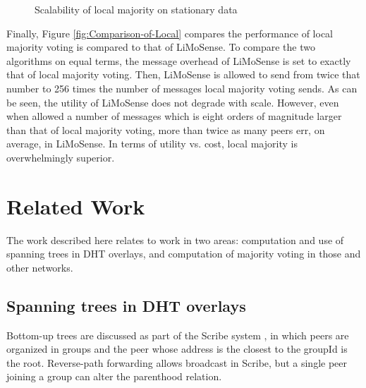\documentclass[12pt,english,journal]{elsarticle}
\numberwithin{equation}{section}
\numberwithin{figure}{section}
\theoremstyle{plain}
\theoremstyle{plain}
\begin{document}
\begin{figure}[p]
\caption{\label{fig:Scalability}Scalability of local majority on stationary
data}


\begin{minipage}[t]{0.5\textwidth}\end{minipage}\begin{minipage}[t]{0.5\textwidth}\end{minipage}

\centering{}\begin{minipage}[t]{0.5\textwidth}\end{minipage}
\end{figure}


Finally, Figure \ref{fig:Comparison-of-Local} compares the performance
of local majority voting is compared to that of LiMoSense. To compare
the two algorithms on equal terms, the message overhead of LiMoSense
is set to exactly that of local majority voting. Then, LiMoSense is
allowed to send from twice that number to 256 times the number of
messages local majority voting sends. As can be seen, the utility
of LiMoSense does not degrade with scale. However, even when allowed
a number of messages which is eight orders of magnitude larger than
that of local majority voting, more than twice as many peers err,
on average, in LiMoSense. In terms of utility vs. cost, local majority
is overwhelmingly superior.


\section{\label{sec:Related-Work}Related Work}

The work described here relates to work in two areas: computation
and use of spanning trees in DHT overlays, and computation of majority
voting in those and other networks.


\subsection{Spanning trees in DHT overlays}

Bottom-up trees are discussed as part of the Scribe system \citep{Scribe},
in which peers are organized in groups and the peer whose address
is the closest to the groupId is the root. Reverse-path forwarding
allows broadcast in Scribe, but a single peer joining a group can
alter the parenthood relation. 
\end{document}
